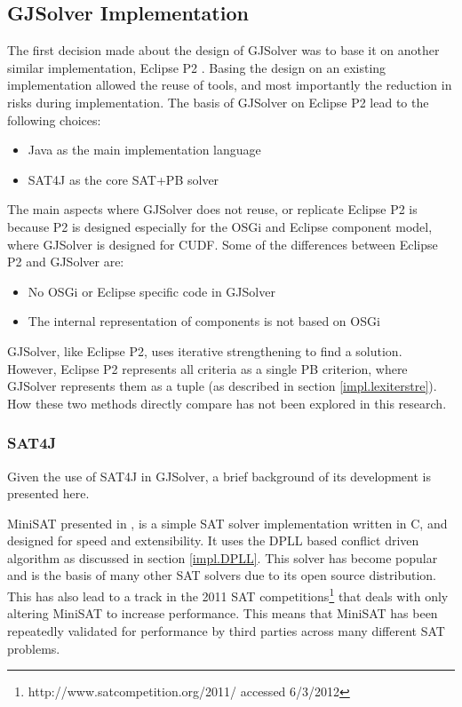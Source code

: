 \subsection{GJSolver Implementation}
\label{impl.gjsolverimpl}
The first decision made about the design of GJSolver was to base it on another similar implementation, Eclipse P2 \citep{le_berre_dependency_2009,leBerre2010}.
Basing the design on an existing implementation allowed the reuse of tools, and most importantly the reduction in risks during implementation.
The basis of GJSolver on Eclipse P2 lead to the following choices:
\begin{itemize}
  \item Java as the main implementation language
  \item SAT4J as the core SAT+PB solver
\end{itemize}

The main aspects where GJSolver does not reuse, or replicate Eclipse P2 is because P2 is designed especially for the OSGi and Eclipse component model, where GJSolver is designed for CUDF.
Some of the differences between Eclipse P2 and GJSolver are:
\begin{itemize}
  \item No OSGi or Eclipse specific code in GJSolver
  \item The internal representation of components is not based on OSGi
\end{itemize}

GJSolver, like Eclipse P2, uses iterative strengthening to find a solution.
However, Eclipse P2 represents all criteria as a single PB criterion, where GJSolver represents them as a tuple (as described in section \ref{impl.lexiterstre}).
How these two methods directly compare has not been explored in this research.

\subsubsection{SAT4J}
Given the use of SAT4J in GJSolver, a brief background of its development is presented here.

MiniSAT presented in \citep{een2003}, is a simple SAT solver implementation written in C, and designed for speed and extensibility.
It uses the DPLL based conflict driven algorithm as discussed in section \ref{impl.DPLL}.
This solver has become popular and is the basis of many other SAT solvers due to its open source distribution.
This has also lead to a track in the 2011 SAT competitions\footnote{http://www.satcompetition.org/2011/ accessed 6/3/2012} that deals with only altering MiniSAT to increase performance.
This means that MiniSAT has been repeatedly validated for performance by third parties across many different SAT problems. 


